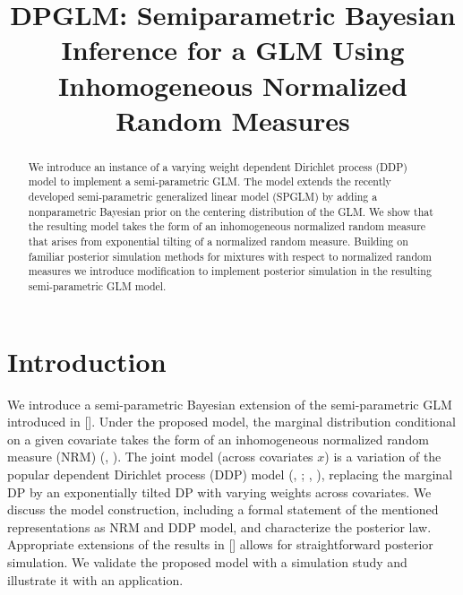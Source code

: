 \documentclass{article}[12pt]
\title{DPGLM: Semiparametric Bayesian Inference for a GLM Using Inhomogeneous Normalized Random Measures
}
\author{}
\date{}
\newcommand{\citeaa}[1]{\citeauthor{#1}, \href{cite.#1}{\textcolor{blue}{\citeyear{#1}}}}     %
\newcommand{\citeab}[1]{\citeauthor{#1} [\href{cite.#1}{\textcolor{blue}{\citeyear{#1}}}]}  %
\newcommand{\citeb}[2]{(\href{cite.#1}{\citeauthor{#1}}, \href{cite.#1}{\textcolor{blue} {\citeyear{#1}}}; \href{cite.#2}{\citeauthor{#2}}, \href{cite.#2}{\textcolor{blue} {\citeyear{#2}}})} %
\begin{document}
\maketitle

\begin{abstract}
  We introduce an instance of a varying weight dependent Dirichlet
process (DDP) model to implement a semi-parametric GLM.  The model
extends the recently developed semi-parametric generalized linear
model (SPGLM) by adding a nonparametric Bayesian prior on the
centering distribution of the GLM. We show that the resulting model
takes the form of an inhomogeneous normalized random measure that
arises from exponential tilting of a normalized random measure.
Building on familiar posterior simulation methods for mixtures with
respect to normalized random measures we introduce modification to
implement posterior simulation in the resulting semi-parametric GLM
model.
\end{abstract}
\section{Introduction}
We introduce a semi-parametric Bayesian extension of the
semi-parametric GLM introduced in
\citeab{rathouz2009generalized}. Under the proposed model, the
marginal distribution conditional on a given covariate takes the form
of an inhomogeneous normalized random measure  (NRM)
(\citeaa{regazzini2003distributional}). The joint model (across covariates $x$) is a  variation of the popular dependent Dirichlet process (DDP) model
\citeb{maceachern;2000}{quintana2022dependent}, replacing the
marginal DP by an exponentially tilted DP with varying weights across
covariates. We discuss the model construction, including a formal
statement of the mentioned representations as NRM and DDP model, and
characterize the posterior law. Appropriate extensions of the results
in \citeab{james2009posterior} allows for straightforward posterior simulation. We validate the proposed model with a simulation study and illustrate it with an application. 

\end{document}
